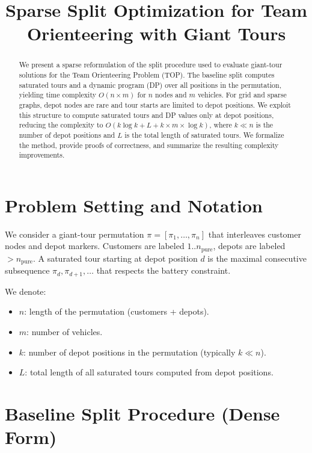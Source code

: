 \documentclass[11pt]{article}
\title{Sparse Split Optimization for Team Orienteering with Giant Tours}
\author{}
\date{}
\theoremstyle{definition}
\begin{document}
\maketitle

\begin{abstract}
We present a sparse reformulation of the split procedure used to evaluate giant-tour solutions for the Team Orienteering Problem (TOP). The baseline split computes saturated tours and a dynamic program (DP) over all positions in the permutation, yielding time complexity $O(n \times m)$ for $n$ nodes and $m$ vehicles. For grid and sparse graphs, depot nodes are rare and tour starts are limited to depot positions. We exploit this structure to compute saturated tours and DP values only at depot positions, reducing the complexity to $O(k \log k + L + k \times m \times \log k)$, where $k \ll n$ is the number of depot positions and $L$ is the total length of saturated tours. We formalize the method, provide proofs of correctness, and summarize the resulting complexity improvements.
\end{abstract}

\section{Problem Setting and Notation}

We consider a giant-tour permutation $\pi = [\pi_1, \ldots, \pi_n]$ that interleaves customer nodes and depot markers. Customers are labeled $1..n_{\text{pure}}$, depots are labeled $> n_{\text{pure}}$. A saturated tour starting at depot position $d$ is the maximal consecutive subsequence $\pi_d, \pi_{d+1}, \ldots$ that respects the battery constraint.

We denote:
\begin{itemize}[nosep]
  \item $n$: length of the permutation (customers + depots).
  \item $m$: number of vehicles.
  \item $k$: number of depot positions in the permutation (typically $k \ll n$).
  \item $L$: total length of all saturated tours computed from depot positions.
\end{itemize}

\section{Baseline Split Procedure (Dense Form)}
\end{document}
